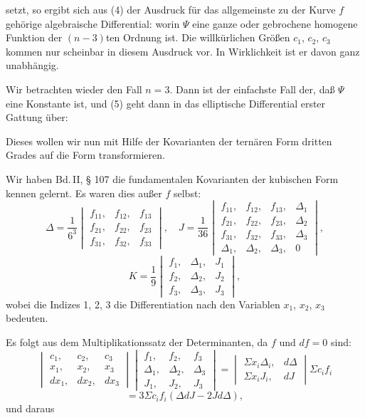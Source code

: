 setzt, so ergibt sich aus (4) der Ausdruck für das allgemeinste
zu der Kurve $f$ gehörige algebraische Differential:
worin $\Psi$ eine ganze oder gebrochene homogene Funktion der
$(n-3)$ten Ordnung ist. Die willkürlichen Größen $c_1$, $c_2$, $c_3$
kommen nur scheinbar in diesem Ausdruck vor. In Wirklichkeit
ist er davon ganz unabhängig.

Wir betrachten wieder den Fall $n=3$. Dann ist der einfachste
Fall der, daß $\Psi$ eine Konstante ist, und (5) geht dann
in das elliptische Differential erster Gattung über:

Dieses wollen wir nun mit Hilfe der Kovarianten der ternären
Form dritten Grades auf die  Form transformieren.

Wir haben Bd.\,II, § 107 die fundamentalen Kovarianten der
kubischen Form kennen gelernt. Es waren dies außer $f$ selbst:
\[
\Delta = \frac{1}{6^3}\begin{vmatrix} f_{11}, & f_{12}, & f_{13} \\ f_{21}, & f_{22}, & f_{23} \\ f_{31}, & f_{32}, & f_{33} \end{vmatrix}, \quad
J = \frac{1}{36}\begin{vmatrix} f_{11}, & f_{12}, & f_{13}, & \Delta_1 \\ f_{21}, & f_{22}, & f_{23}, & \Delta_2 \\ f_{31}, & f_{32}, & f_{33}, & \Delta_3 \\ \Delta_1, & \Delta_2, & \Delta_3, & 0 \end{vmatrix},
\]
\[
K = \frac{1}{9}\begin{vmatrix} f_1, & \Delta_1, & J_1 \\ f_2, & \Delta_2, & J_2 \\ f_3, & \Delta_3, & J_3 \end{vmatrix},
\]
wobei die Indizes 1, 2, 3 die Differentiation nach den Variablen
$x_1$, $x_2$, $x_3$ bedeuten.

Es folgt aus dem Multiplikationssatz der Determinanten, da
$f$ und $df=0$ sind:
\[
\begin{vmatrix} c_1, & c_2, & c_3 \\ x_1, & x_2, & x_3 \\ dx_1, & dx_2, & dx_3 \end{vmatrix}
\begin{vmatrix} f_1, & f_2, & f_3 \\ \Delta_1, & \Delta_2, & \Delta_3 \\ J_1, & J_2, & J_3 \end{vmatrix}
=
\begin{vmatrix} \Sigma x_i\Delta_i, & d\Delta \\ \Sigma x_iJ_i, & dJ \end{vmatrix}
\Sigma c_if_i
\]
\[
= 3\Sigma c_if_i(\Delta dJ - 2Jd\Delta),
\]
und daraus

